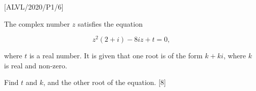 \item {[}ALVL/2020/P1/6{]}

The complex number $z$ satisfies the equation

\[
z^{2}\left(2+i\right)-8iz+t=0,
\]

where $t$ is a real number. It is given that one root is of the form
$k+ki$, where $k$ is real and non-zero. 

Find $t$ and $k$, and the other root of the equation. \hfill{}{[}8{]}
